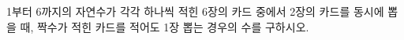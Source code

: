 \hspace*{2mm}\begin{minipage}[t]{\dimexpr\linewidth-2mm\relax}\vspace{0pt}
1부터 6까지의 자연수가 각각 하나씩 적힌 6장의 카드 중에서 2장의 카드를 동시에 뽑을 때, 짝수가 적힌 카드를 적어도 1장 뽑는 경우의 수를 구하시오.\end{minipage}
